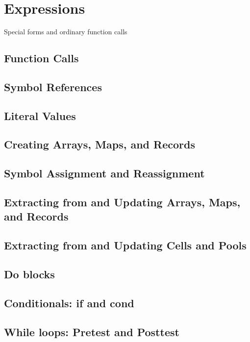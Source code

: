 \documentclass{article}
\begin{document}
\pagebreak

\section{Expressions}

Special forms and ordinary function calls

\subsection{Function Calls}

\subsection{Symbol References}

\subsection{Literal Values}

\subsection{Creating Arrays, Maps, and Records}

\subsection{Symbol Assignment and Reassignment}

\subsection{Extracting from and Updating Arrays, Maps, and Records}

\subsection{Extracting from and Updating Cells and Pools}

\subsection{Do blocks}

\subsection{Conditionals: if and cond}

\subsection{While loops: Pretest and Posttest}
\end{document}
